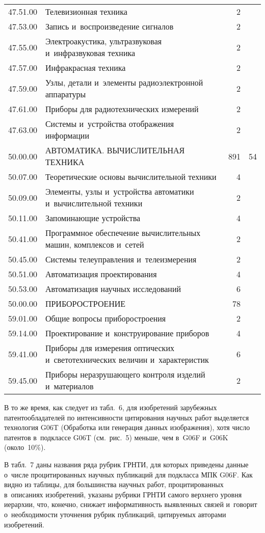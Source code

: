 \begin{multicols}{2}
\begin{table*}
\begin{center}
\begin{tabular}{|c|p{110mm}|r|c|}
47.51.00&Телевизионная техника&2&\\
47.53.00&Запись и~воспроизведение сигналов&2&\\
47.55.00&Электроакустика, ультразвуковая и~инфразвуковая техника&2&\\
47.57.00&Инфракрасная техника&2&\\
47.59.00&Узлы, детали и~элементы радиоэлектронной аппаратуры&2&\\
47.61.00&Приборы для радиотехнических измерений&2&\\
47.63.00&Системы и~устройства отображения информации&2&\\
50.00.00&АВТОМАТИКА. ВЫЧИСЛИТЕЛЬНАЯ ТЕХНИКА&891&54\\
50.07.00&Теоретические основы вычислительной техники&4&\\
50.09.00&Элементы, узлы и~устройства автоматики и~вычислительной техники&2&\\
50.11.00&Запоминающие устройства&4&\\
50.41.00&Программное обеспечение вычислительных машин, комплексов и~сетей&2&\\
50.45.00&Системы телеуправления и~телеизмерения&2&\\
50.51.00&Автоматизация проектирования&4&\\
50.53.00&Автоматизация научных исследований&6&\\
50.00.00&ПРИБОРОСТРОЕНИЕ&78&\\
59.01.00&Общие вопросы приборостроения&2&\\
59.14.00&Проектирование и~конструирование приборов&4&\\
59.41.00&Приборы для измерения оптических и~светотехнических величин и~характеристик&6&\\
59.45.00&Приборы неразрушающего контроля изделий и~материалов&2&\\
\hline
\end{tabular}
\end{center}
\end{table*}
     
     В то же время, как следует из табл.~6, для изобретений зарубежных 
патентообладателей по интенсивности цитирования научных работ выделяется 
технология G06T (Обработка или генерация данных изображения), хотя число 
патентов в~подклассе G06T (см.\ рис.~5) меньше, чем в~G06F и~G06K 
(около~10\%).
     
     В табл.~7 даны названия ряда рубрик ГРНТИ, для которых приведены 
данные о~чис\-ле процитированных научных публикаций для подкласса МПК G06F. 
Как видно из таблицы, для большинства научных работ, процитированных 
в~описаниях изобретений, указаны рубрики ГРНТИ самого верхнего уровня 
иерархии, что, конечно, снижает информативность выявленных связей и~говорит 
о~необходимости уточнения рубрик публикаций, цитируемых авторами 
изобретений.
     

\end{multicols}
